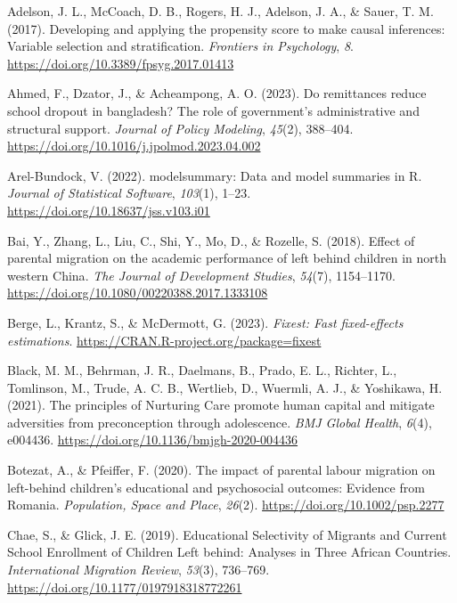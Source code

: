 \documentclass[
  man]{apa7}
\newlength{\cslhangindent}
\newlength{\cslentryspacingunit} %
\newenvironment{CSLReferences}[2] %
 {%
  \setlength{\parindent}{0pt}
  \ifodd #1
  \let\oldpar\par
  \def\par{\hangindent=\cslhangindent\oldpar}
  \fi
  \setlength{\parskip}{#2\cslentryspacingunit}
 }%
 {}
\begin{document}
\hypertarget{refs}{}
\begin{CSLReferences}{1}{0}
\leavevmode{}%
Adelson, J. L., McCoach, D. B., Rogers, H. J., Adelson, J. A., \& Sauer, T. M. (2017). Developing and applying the propensity score to make causal inferences: Variable selection and stratification. \emph{Frontiers in Psychology}, \emph{8}. \url{https://doi.org/10.3389/fpsyg.2017.01413}

\leavevmode{}%
Ahmed, F., Dzator, J., \& Acheampong, A. O. (2023). Do remittances reduce school dropout in bangladesh? The role of government{'}s administrative and structural support. \emph{Journal of Policy Modeling}, \emph{45}(2), 388--404. \url{https://doi.org/10.1016/j.jpolmod.2023.04.002}

\leavevmode{}%
Arel-Bundock, V. (2022). {modelsummary}: Data and model summaries in {R}. \emph{Journal of Statistical Software}, \emph{103}(1), 1--23. \url{https://doi.org/10.18637/jss.v103.i01}

\leavevmode{}%
Bai, Y., Zhang, L., Liu, C., Shi, Y., Mo, D., \& Rozelle, S. (2018). Effect of parental migration on the academic performance of left behind children in north western {China}. \emph{The Journal of Development Studies}, \emph{54}(7), 1154--1170. \url{https://doi.org/10.1080/00220388.2017.1333108}

\leavevmode{}%
Berge, L., Krantz, S., \& McDermott, G. (2023). \emph{Fixest: Fast fixed-effects estimations}. \url{https://CRAN.R-project.org/package=fixest}

\leavevmode{}%
Black, M. M., Behrman, J. R., Daelmans, B., Prado, E. L., Richter, L., Tomlinson, M., Trude, A. C. B., Wertlieb, D., Wuermli, A. J., \& Yoshikawa, H. (2021). The principles of Nurturing Care promote human capital and mitigate adversities from preconception through adolescence. \emph{BMJ Global Health}, \emph{6}(4), e004436. \url{https://doi.org/10.1136/bmjgh-2020-004436}

\leavevmode{}%
Botezat, A., \& Pfeiffer, F. (2020). The impact of parental labour migration on left{-}behind children's educational and psychosocial outcomes: Evidence from Romania. \emph{Population, Space and Place}, \emph{26}(2). \url{https://doi.org/10.1002/psp.2277}

\leavevmode{}%
Chae, S., \& Glick, J. E. (2019). Educational Selectivity of Migrants and Current School Enrollment of Children Left behind: Analyses in Three African Countries. \emph{International Migration Review}, \emph{53}(3), 736--769. \url{https://doi.org/10.1177/0197918318772261}


\end{CSLReferences}
\end{document}
